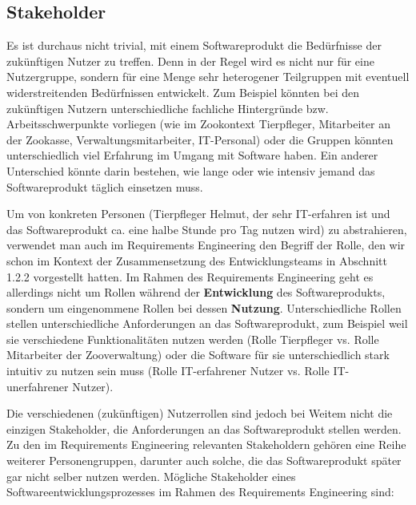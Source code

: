 \subsection{Stakeholder}
\label{sec:Kap-6.1.1}

Es ist durchaus nicht trivial, mit einem Softwareprodukt die Bedürfnisse der zukünftigen Nutzer zu treffen. Denn in der Regel wird es nicht nur für eine Nutzergruppe, sondern für eine Menge sehr heterogener Teilgruppen mit eventuell widerstreitenden Bedürfnissen entwickelt. Zum Beispiel könnten bei den zukünftigen Nutzern unterschiedliche fachliche Hintergründe bzw. Arbeitsschwerpunkte vorliegen (wie \zb im Zookontext Tierpfleger, Mitarbeiter an der Zookasse, Verwaltungsmitarbeiter, IT-Personal) oder die Gruppen könnten unterschiedlich viel Erfahrung im Umgang mit Software haben. Ein anderer Unterschied könnte darin bestehen, wie lange oder wie intensiv jemand das Softwareprodukt täglich einsetzen muss. 

Um von konkreten Personen (\zb Tierpfleger Helmut, der sehr IT-erfahren ist und das Softwareprodukt ca. eine halbe Stunde pro Tag nutzen wird) zu abstrahieren, verwendet man auch im Requirements Engineering den Begriff der Rolle, 
den wir schon im Kontext der Zusammensetzung des Entwicklungsteams in Abschnitt 1.2.2 %
vorgestellt hatten. Im Rahmen des Requirements Engineering geht es allerdings nicht um Rollen während der \textbf{Entwicklung} des Softwareprodukts, sondern um eingenommene Rollen bei dessen \textbf{Nutzung}. Unterschiedliche Rollen stellen unterschiedliche Anforderungen an das Softwareprodukt, zum Beispiel weil sie verschiedene Funktionalitäten nutzen werden (\zb Rolle Tierpfleger vs. Rolle Mitarbeiter der Zoo\-verwaltung) oder die Software für sie unterschiedlich stark intuitiv zu nutzen sein muss (\zb Rolle IT-erfahrener Nutzer vs. Rolle IT-unerfahrener Nutzer).

Die verschiedenen (zukünftigen) Nutzerrollen sind jedoch bei Weitem nicht die einzigen Stakeholder, die Anforderungen an das Softwareprodukt stellen werden. Zu den im Requirements Engineering relevanten Stakeholdern gehören eine Reihe weiterer Personengruppen, darunter auch solche, die das Softwareprodukt später gar nicht selber nutzen werden. Mögliche Stakeholder eines Softwareentwicklungsprozesses im Rahmen des Requirements Engineering sind:

